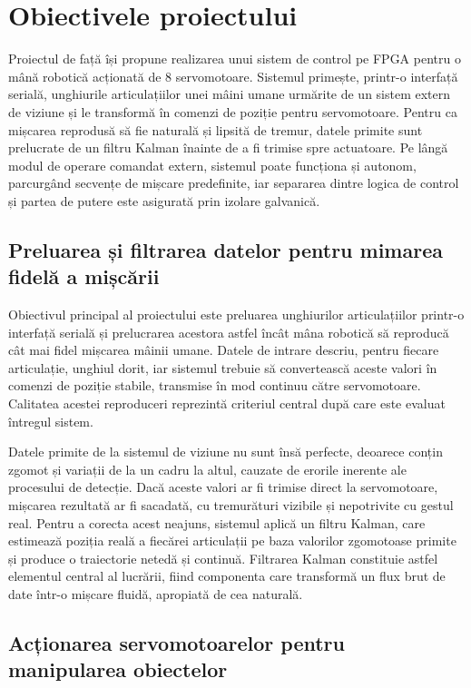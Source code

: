 \chapter{Obiectivele proiectului}\label{ch:obiective}
\pagestyle{fancy}

Proiectul de față își propune realizarea unui sistem de control pe FPGA pentru o
mână robotică acționată de 8 servomotoare. Sistemul primește, printr-o interfață
serială, unghiurile articulațiilor unei mâini umane urmărite de un sistem extern
de viziune și le transformă în comenzi de poziție pentru servomotoare. Pentru ca
mișcarea reprodusă să fie naturală și lipsită de tremur, datele primite sunt
prelucrate de un filtru Kalman înainte de a fi trimise spre actuatoare. Pe lângă
modul de operare comandat extern, sistemul poate funcționa și autonom, parcurgând
secvențe de mișcare predefinite, iar separarea dintre logica de control și partea
de putere este asigurată prin izolare galvanică.

\section{Preluarea și filtrarea datelor pentru mimarea fidelă a mișcării}
\label{sec:obj-principal}

Obiectivul principal al proiectului este preluarea unghiurilor articulațiilor
printr-o interfață serială și prelucrarea acestora astfel încât mâna robotică să
reproducă cât mai fidel mișcarea mâinii umane. Datele de intrare descriu, pentru
fiecare articulație, unghiul dorit, iar sistemul trebuie să convertească aceste
valori în comenzi de poziție stabile, transmise în mod continuu către
servomotoare. Calitatea acestei reproduceri reprezintă criteriul central după care
este evaluat întregul sistem.

Datele primite de la sistemul de viziune nu sunt însă perfecte, deoarece conțin
zgomot și variații de la un cadru la altul, cauzate de erorile inerente ale
procesului de detecție. Dacă aceste valori ar fi trimise direct la servomotoare, mișcarea
rezultată ar fi sacadată, cu tremurături vizibile și nepotrivite cu gestul real.
Pentru a corecta acest neajuns, sistemul aplică un filtru Kalman, care estimează
poziția reală a fiecărei articulații pe baza valorilor zgomotoase primite și
produce o traiectorie netedă și continuă. Filtrarea Kalman constituie astfel
elementul central al lucrării, fiind componenta care transformă un flux brut de
date într-o mișcare fluidă, apropiată de cea naturală.

\section{Acționarea servomotoarelor pentru manipularea obiectelor}
\label{sec:obj-pwm}

